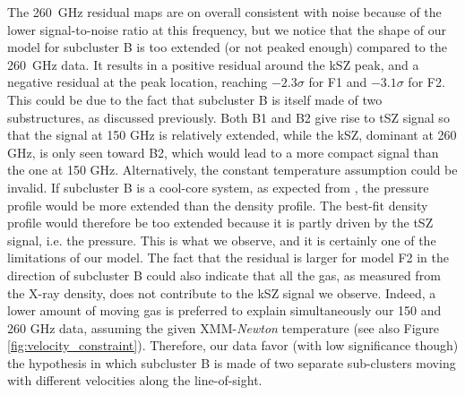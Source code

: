 \documentclass[twocolumn,traditabstract]{aa}
\begin{document}
The 260~GHz residual maps are on overall consistent with noise because of the lower signal-to-noise ratio at this frequency, but we notice that the shape of our model for subcluster B is too extended (or not peaked enough) compared to the 260~GHz data. It results in a positive residual around the kSZ peak, and a negative residual at the peak location, reaching $-2.3 \sigma$ for F1 and $-3.1 \sigma$ for F2. This could be due to the fact that subcluster B is itself made of two substructures, as discussed previously. Both B1 and B2 give rise to tSZ signal so that the signal at 150 GHz is relatively extended, while the kSZ, dominant at 260 GHz, is only seen toward B2, which would lead to a more compact signal than the one at 150 GHz. Alternatively, the constant temperature assumption could be invalid. If subcluster B is a cool-core system, as expected from \cite{Ma2009}, the pressure profile would be more extended than the density profile. The best-fit density profile would therefore be too extended because it is partly driven by the tSZ signal, i.e. the pressure. This is what we observe, and it is certainly one of the limitations of our model. The fact that the residual is larger for model F2 in the direction of subcluster B could also indicate that all the gas, as measured from the X-ray density, does not contribute to the kSZ signal we observe. Indeed, a lower amount of moving gas is preferred to explain simultaneously our 150 and 260 GHz data, assuming the given XMM-\textit{Newton} temperature (see also Figure \ref{fig:velocity_constraint}). Therefore, our data favor (with low significance though) the hypothesis in which subcluster B is made of two separate sub-clusters moving with different velocities along the line-of-sight.
\end{document}

